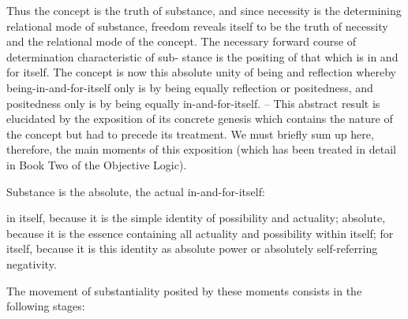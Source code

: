 Thus the concept is the truth of substance,
and since necessity is the determining relational mode of substance,
freedom reveals itself to be the truth of necessity and
the relational mode of the concept.
The necessary forward course of determination characteristic of sub-
stance is the positing of that which is in and for itself.
The concept is now this absolute unity of being and reflection whereby being-in-and-for-itself
only is by being equally reflection or positedness, and positedness only is by
being equally in-and-for-itself.
– This abstract result is elucidated by the
exposition of its concrete genesis which contains the nature of the concept
but had to precede its treatment.
We must briefly sum up here, therefore, the main moments of this exposition
(which has been treated in detail in Book Two of the Objective Logic).

Substance is the absolute, the actual in-and-for-itself:

in itself, because it is the simple identity of possibility and actuality;
absolute, because it is the essence containing all actuality and possibility within itself;
for itself, because it is this identity as absolute power or absolutely self-referring negativity.

The movement of substantiality posited by these moments consists in the following stages:

